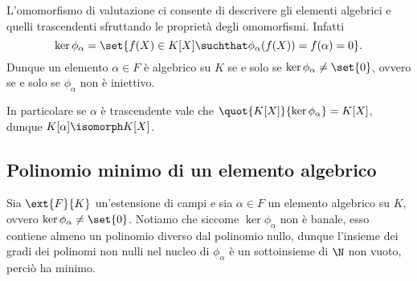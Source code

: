\begin{remark}
    L'omomorfismo di valutazione ci consente di descrivere gli elementi algebrici e quelli trascendenti sfruttando le proprietà degli omomorfismi. Infatti \[
        \ker \phi_\alpha = \set{f(X) \in K[X] \suchthat \phi_\alpha(f(X)) = f(\alpha) = 0}.    
    \] Dunque un elemento $\alpha \in F$ è algebrico su $K$ se e solo se $\ker \phi_\alpha \neq \set{0}$, ovvero se e solo se $\phi_\alpha$ non è iniettivo.

    In particolare se $\alpha$ è trascendente vale che $\quot{K[X]}{\ker \phi_\alpha} = K[X]$, dunque $K[\alpha] \isomorph K[X]$.
\end{remark}

\subsection{Polinomio minimo di un elemento algebrico}
Sia $\ext{F}{K}$ un'estensione di campi e sia $\alpha \in F$ un elemento algebrico su $K$, ovvero $\ker \phi_\alpha \neq \set{0}$.
Notiamo che siccome $\ker \phi_\alpha$ non è banale, esso contiene almeno un polinomio diverso dal polinomio nullo, dunque l'insieme dei gradi dei polinomi non nulli nel nucleo di $\phi_\alpha$ è un sottoinsieme di $\N$ non vuoto, perciò ha minimo.

